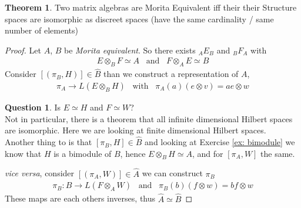 \documentclass[a4paper]{article}
\theoremstyle{definition}
\theoremstyle{definition}
\newtheorem{question}{Question}
\theoremstyle{definition}
\theoremstyle{theorem}
\newtheorem{theorem}{Theorem}
\theoremstyle{theorem}
\begin{document}
\begin{theorem}
    Two matrix algebras are Morita Equivalent iff their their Structure spaces
    are isomorphic as discreet spaces (have the same cardinality / same number of elements)
\end{theorem}
\begin{proof}
    Let $A$, $B$ be \textit{Morita equivalent}. So there exists $_A E_B$ and $_B F_A$ with
    \begin{align}
        E \otimes _B F \simeq A \;\;\; \text{and} \;\;\; F \otimes _A E \simeq B
    \end{align}
    Consider $[(\pi _B, H)] \in \hat{B}$ than we construct a representation of $A$,
    \begin{align}
        \pi _A \rightarrow L(E \otimes _B H)\;\;\; \text{with} \;\;\; \pi _A(a) (e \otimes v) = a e \otimes w
    \end{align}
    \begin{question}
        Is $E \simeq H$ and $F \simeq W$? \\
        Not in particular, there is a theorem that all infinite dimensional Hilbert spaces are isomorphic.
        Here we are looking at finite dimensional Hilbert spaces.\\
        Another thing to is that $[\pi _B, H] \in \hat{B}$ and looking at Exercise \ref{ex: bimodule}
        we know that $H$ is a bimodule of $B$, hence $E \otimes _B H\simeq A$, and for $[\pi _A, W]$
        the same.
    \end{question}
    \textit{vice versa}, consider $[(\pi _A, W)] \in \hat{A}$ we can construct $\pi _B$
    \begin{align}
        \pi _B: B \rightarrow L(F \otimes _A W) \;\;\; \text{and}\;\;\; \pi _B(b) (f\otimes w) = bf\otimes w
    \end{align}
    These maps are each others inverses, thus $\hat{A} \simeq \hat{B}$
\end{proof}
\end{document}
